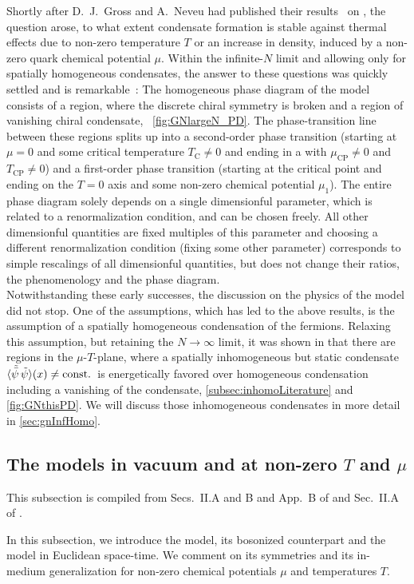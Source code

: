 Shortly after D.~J.~Gross and A.~Neveu had published their results~\cite{Gross:1974jv} on \csb{}, the question arose, to what extent condensate formation is stable against thermal effects due to non-zero temperature $T$ or an increase in density, induced by a non-zero quark chemical potential $\mu$.
Within the infinite-$N$ limit and allowing only for spatially homogeneous condensates, the answer to these questions was quickly settled and is remarkable~\cite{Dolan:1973qd,Harrington:1974te,Harrington:1974tf,Jacobs:1974ys,Dashen:1974xz,Dashen:1975xh,Wolff:1985av,Treml:1989,Pausch:1991ee,Karbstein:2006er}: The homogeneous phase diagram of the \gn{} model consists of a region, where the discrete chiral symmetry is broken and a region of vanishing chiral condensate, \cf{}\ \cref{fig:GNlargeN_PD}.
The phase-transition line between these regions splits up into a second-order phase transition (starting at $\mu = 0$ and some critical temperature $T_\mathrm{C} \neq 0$ and ending in a \cp{} with $\mu_\mathrm{CP} \neq 0$ and $T_\mathrm{CP} \neq 0$) and a first-order phase transition (starting at the critical point and ending on the $T = 0$ axis and some non-zero chemical potential $\mu_1$).
The entire phase diagram solely depends on a single dimensionful parameter, which is related to a renormalization condition, and can be chosen freely.
All other dimensionful quantities are fixed multiples of this parameter and choosing a different renormalization condition (fixing some other parameter) corresponds to simple rescalings of all dimensionful quantities, but does not change their ratios, the phenomenology and the phase diagram.\\

Notwithstanding these early successes, the discussion on the physics of the \gn{} model did not stop.
One of the assumptions, which has led to the above results, is the assumption of a spatially homogeneous condensation of the fermions.
Relaxing this assumption, but retaining the $N \rightarrow \infty$ limit, it was shown in  that there are regions in the $\mu$-$T$-plane, where a spatially inhomogeneous but static condensate $\langle \tilde{\bar{\psi}} \, \tilde{\psi} \rangle ( x ) \neq \mathrm{const}.$\ is energetically favored over homogeneous condensation including a vanishing of the condensate, \cf{} \cref{subsec:inhomoLiterature} and \cref{fig:GNthisPD}.
We will discuss those inhomogeneous condensates in more detail in \cref{sec:gnInfHomo}.

\subsection{The models in vacuum and at non-zero \texorpdfstring{$T$}{T} and \texorpdfstring{$\mu$}{mu}}\label{subsec:gnyTmu}
\begin{disclaimer}
	This subsection is compiled from Secs.~II.A and B and App.~B of  and Sec.~II.A of .
\end{disclaimer}
In this subsection, we introduce the \gn{} model, its bosonized counterpart and the \gny{} model in Euclidean space-time.
We comment on its symmetries and its in-medium generalization for non-zero chemical potentials $\mu$ and temperatures $T$.

